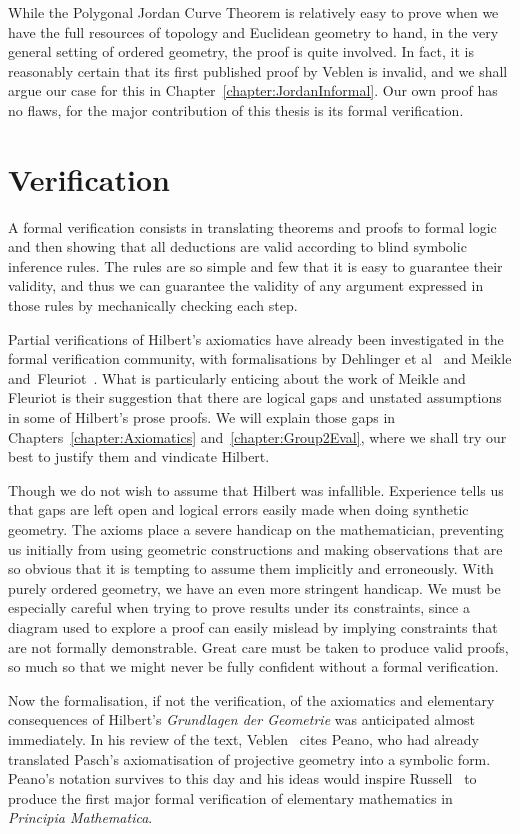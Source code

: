 While the Polygonal Jordan Curve Theorem is relatively easy to prove when we have the full resources of topology and Euclidean geometry to hand, in the very general setting of ordered geometry, the proof is quite involved. In fact, it is reasonably certain that its first published proof by Veblen is invalid, and we shall argue our case for this in Chapter~\ref{chapter:JordanInformal}. Our own proof has no flaws, for the major contribution of this thesis is its formal verification.

\section{Verification}
A formal verification consists in translating theorems and proofs to formal logic and then showing that all deductions are valid according to blind symbolic inference rules. The rules are so simple and few that it is easy to guarantee their validity, and thus we can guarantee the validity of any argument expressed in those rules by mechanically checking each step.

Partial verifications of Hilbert's axiomatics have already been investigated in the formal verification community, with formalisations by Dehlinger et al~\cite{DehlingerFOG} and Meikle and~Fleuriot~\cite{MeikleFleuriotFormalizingHilbert}. What is particularly enticing about the work of Meikle and Fleuriot is their suggestion that there are logical gaps and unstated assumptions in some of Hilbert's prose proofs. We will explain those gaps in Chapters~\ref{chapter:Axiomatics} and~\ref{chapter:Group2Eval}, where we shall try our best to justify them and vindicate Hilbert.

Though we do not wish to assume that Hilbert was infallible. Experience tells us that gaps are left open and logical errors easily made when doing synthetic geometry. The axioms place a severe handicap on the mathematician, preventing us initially from using geometric constructions and making observations that are so obvious that it is tempting to assume them implicitly and erroneously. With purely ordered geometry, we have an even more stringent handicap. We must be especially careful when trying to prove results under its constraints, since a diagram used to explore a proof can easily mislead by implying constraints that are not formally demonstrable. Great care must be taken to produce valid proofs, so much so that we might never be fully confident without a formal verification.

Now the formalisation, if not the verification, of the axiomatics and elementary consequences of Hilbert's \emph{Grundlagen der Geometrie} was anticipated almost immediately. In his review of the text, Veblen~\cite{VeblenHilbertReview} cites Peano, who had already translated Pasch's axiomatisation of projective geometry into a symbolic form. Peano's notation survives to this day and his ideas would inspire Russell~\cite{PrinciplesOfMathematics} to produce the first major formal verification of elementary mathematics in \emph{Principia Mathematica}.

